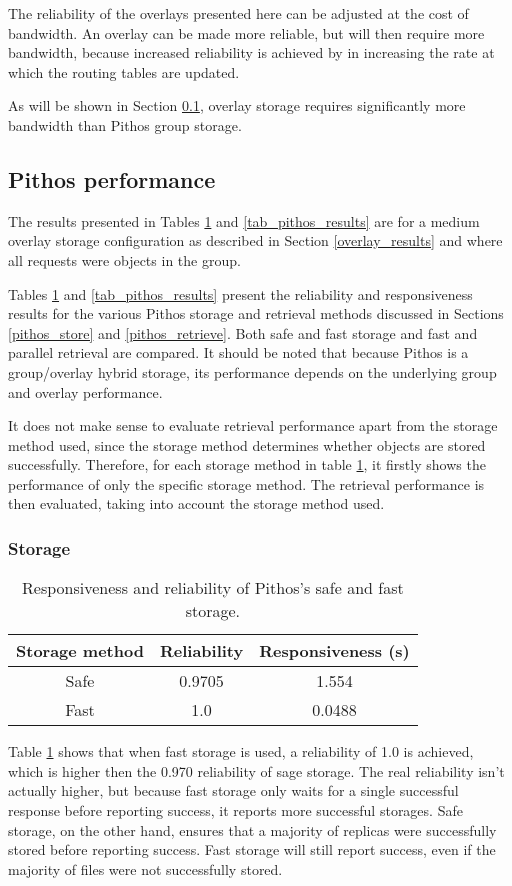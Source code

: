 The reliability of the overlays presented here can be adjusted at the cost of bandwidth. An overlay can be made more reliable, but will then require more bandwidth, because increased reliability is achieved by in increasing the rate at which the routing tables are updated.

As will be shown in Section \ref{pithos_resp_rel_results}, overlay storage requires significantly more bandwidth than Pithos group storage.

\subsection{Pithos performance}
\label{pithos_resp_rel_results}

The results presented in Tables \ref{tab_pithos_storage_results} and \ref{tab_pithos_results} are for a medium overlay storage configuration as described in Section \ref{overlay_results} and where all requests were objects in the group.

Tables \ref{tab_pithos_storage_results} and \ref{tab_pithos_results} present the reliability and responsiveness results for the various Pithos storage and retrieval methods discussed in Sections \ref{pithos_store} and \ref{pithos_retrieve}. Both safe and fast storage and fast and parallel retrieval are compared. It should be noted that because Pithos is a group/overlay hybrid storage, its performance depends on the underlying group and overlay performance.

It does not make sense to evaluate retrieval performance apart from the storage method used, since the storage method determines whether objects are stored successfully. Therefore, for each storage method in table \ref{tab_pithos_storage_results}, it firstly shows the performance of only the specific storage method. The retrieval performance is then evaluated, taking into account the storage method used.

\subsubsection{Storage}
\begin{table}[htbp]
\centering
\begin{tabular}{|c|c|c|}
\hline
Storage method & Reliability & Responsiveness (s)\\
\hline
Safe    &  0.9705  &   1.554  \\
Fast    &  1.0     &   0.0488 \\
\hline
\end{tabular}
\caption{Responsiveness and reliability of Pithos's safe and fast storage.}
\label{tab_pithos_storage_results}
\end{table}
%
Table \ref{tab_pithos_storage_results} shows that when fast storage is used, a reliability of 1.0 is achieved, which is higher then the 0.970 reliability of sage storage. The real reliability isn't actually higher, but because fast storage only waits for a single successful response before reporting success, it reports more successful storages. Safe storage, on the other hand, ensures that a majority of replicas were successfully stored before reporting success. Fast storage will still report success, even if the majority of files were not successfully stored.

